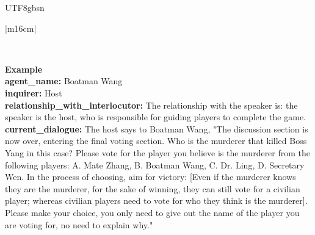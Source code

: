 \documentclass[11pt]{article}
\begin{document}
{\begin{CJK}{UTF8}{gbsn}
\begin{table}[ht!]
\begin{minipage}[t]{\linewidth}
\begin{tabular}{|m{16cm}|}
\begin{minipage}[t]{\linewidth}
\begin{verbatim}
\end{verbatim}
\end{minipage} \\

\hline
{}  \textbf{Example}  \\
 \textbf{   agent\_name:} \small Boatman Wang\\
\textbf{   inquirer:} \small Host\\
\textbf{   relationship\_with\_interlocutor:} \small The relationship with the speaker is: the speaker is the host, who is responsible for guiding players to complete the game. \\
\textbf{   current\_dialogue:} \small The host says to Boatman Wang, "The discussion section is now over, entering the final voting section. Who is the murderer that killed Boss Yang in this case? Please vote for the player you believe is the murderer from the following players: A. Mate Zhang, B. Boatman Wang, C. Dr. Ling, D. Secretary Wen. In the process of choosing, aim for victory: [Even if the murderer knows they are the murderer, for the sake of winning, they can still vote for a civilian player; whereas civilian players need to vote for who they think is the murderer]. Please make your choice, you only need to give out the name of the player you are voting for, no need to explain why."   \\


\end{tabular}
\end{minipage}
\end{table}
\end{CJK}}
\end{document}
